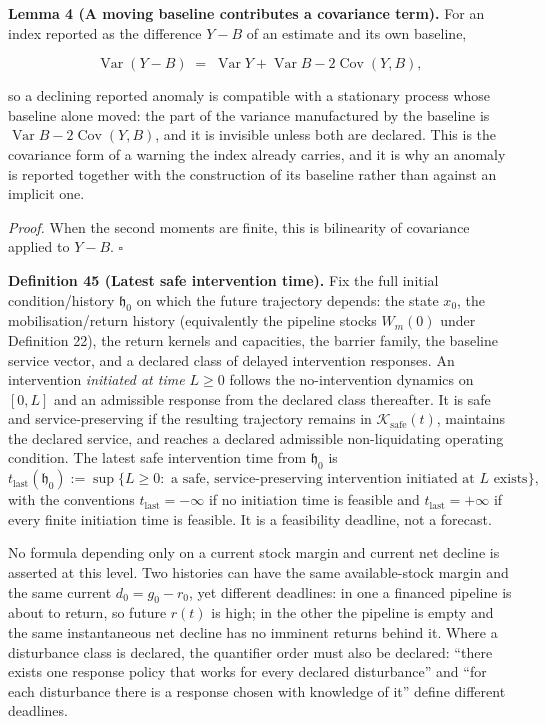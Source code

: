 \documentclass[11pt]{article}
\begin{document}
\textbf{Lemma 4 (A moving baseline contributes a covariance term).} For an index reported as the difference \(Y - B\) of an estimate and its own baseline, 

$$\operatorname{Var}(Y - B) \;=\; \operatorname{Var} Y + \operatorname{Var} B - 2\operatorname{Cov}(Y, B) ,$$

 so a declining reported anomaly is compatible with a stationary process whose baseline alone moved: the part of the variance manufactured by the baseline is \(\operatorname{Var} B - 2\operatorname{Cov}(Y,\allowbreak{} B)\), and it is invisible unless both are declared. This is the covariance form of a warning the index already carries, and it is why an anomaly is reported together with the construction of its baseline rather than against an implicit one.

\emph{Proof.} When the second moments are finite, this is bilinearity of covariance applied to \(Y-B\). \(\square\)

\textbf{Definition 45 (Latest safe intervention time).} Fix the full initial condition/history \(\mathfrak h_0\) on which the future trajectory depends: the state \(x_0\), the mobilisation/return history (equivalently the pipeline stocks \(W_m(0)\) under Definition 22), the return kernels and capacities, the barrier family, the baseline service vector, and a declared class of delayed intervention responses. An intervention \emph{initiated at time \(L\ge0\)} follows the no-intervention dynamics on \([0,L]\) and an admissible response from the declared class thereafter. It is safe and service-preserving if the resulting trajectory remains in \(\mathcal K_{\mathrm{safe}}(t)\), maintains the declared service, and reaches a declared admissible non-liquidating operating condition. The latest safe intervention time from \(\mathfrak h_0\) is
$$t_{\mathrm{last}}(\mathfrak h_0):=\sup\{L\ge0:\text{ a safe, service-preserving intervention initiated at }L\text{ exists}\},$$
with the conventions \(t_{\mathrm{last}}=-\infty\) if no initiation time is feasible and \(t_{\mathrm{last}}=+\infty\) if every finite initiation time is feasible. It is a feasibility deadline, not a forecast.

No formula depending only on a current stock margin and current net decline is asserted at this level. Two histories can have the same available-stock margin and the same current \(d_0=g_0-r_0\), yet different deadlines: in one a financed pipeline is about to return, so future \(r(t)\) is high; in the other the pipeline is empty and the same instantaneous net decline has no imminent returns behind it. Where a disturbance class is declared, the quantifier order must also be declared: ``there exists one response policy that works for every declared disturbance'' and ``for each disturbance there is a response chosen with knowledge of it'' define different deadlines.
\end{document}
